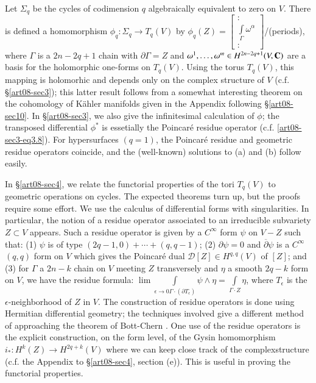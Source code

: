 Let $\Sigma_{q}$ be the cycles of codimension $q$ algebraically equivalent to zero on $V$. There is defined a homomorphism $\phi_{q}:\Sigma_{q}\to T_{q}(V)$ by $\phi_{q}(Z)=\left[\begin{smallmatrix}:\\ \int\limits_{\Gamma}\omega^{\alpha}\\ :\end{smallmatrix}\right]$/(periods), where $\Gamma$ is a $2n-2q+1$ chain with $\partial \Gamma=Z$ and $\omega^{1},\ldots,\omega^{m}\in H^{2n-2q+1}(V,\mathbf{C})$ are a basis for the holomorphic one-forms on $T_{q}(V)$. Using the torus $T_{q}(V)$, this mapping is holomorhic and depends only on the complex structure of $V$ (c.f. \S\ref{art08-sec3}); this latter result follows from a somewhat interesting theorem on the cohomology of K\"ahler manifolds given in the Appendix following \S\ref{art08-sec10}. In \S\ref{art08-sec3}, we also give the infinitesimal calculation of $\phi$; the transposed differential $\phi^{*}$ is essetially the Poincar\'e residue operator (c.f. \eqref{art08-sec3-eq3.8}). For hypersurfaces $(q=1)$, the Poincar\'e residue and geometric residue operators coincide, and the (well-known) solutions to (a) and (b) follow easily.

In \S\ref{art08-sec4}, we relate the functorial properties of the tori $T_{q}(V)$ to geometric operations on cycles. The expected theorems turn up, but the proofs require some effort. We use the calculus of differential forms with singularities. In particular, the notion of a residue operator associated to an irreducible subvariety $Z\subset V$ appears. Such a residue operator is given by a $C^{\infty}$ form $\psi$ on $V-Z$ such that: (1) $\psi$ is of type $(2q-1,0)+\cdots+(q,q-1)$; (2) $\partial \psi=0$ and $\overline{\partial}\psi$ is a $C^{\infty}$ $(q,q)$ form on $V$ which gives the Poincar\'e dual $\mathscr{D}[Z]\in H^{q,q}(V)$ of $[Z]$; and (3) for $\Gamma$ a $2n-k$ chain on $V$ meeting $Z$ transversely and $\eta$ a smooth $2q-k$ form on $V$, we have the residue formula: $\lim \int\limits_{\epsilon\to 0\Gamma\cdot (\partial T_{\epsilon})}\psi \wedge \eta=\int\limits_{\Gamma\cdot Z}\eta$, where $T_{\epsilon}$ is the $\epsilon$-neighborhood of $Z$ in $V$. The construction of residue operators is done using Hermitian differential geometry; the techniques involved give a different method of approaching the theorem of Bott-Chern \cite{art08-key4}. One use of the residue operators is the explicit construction, on the form level, of the Gysin homomorphism $i_{*}:H^{k}(Z)\to H^{2q+k}(V)$ where we can keep close track of the complex\pageoriginale structure (c.f. the Appendix to \S\ref{art08-sec4}, section (e)). This is useful in proving the functorial properties.

